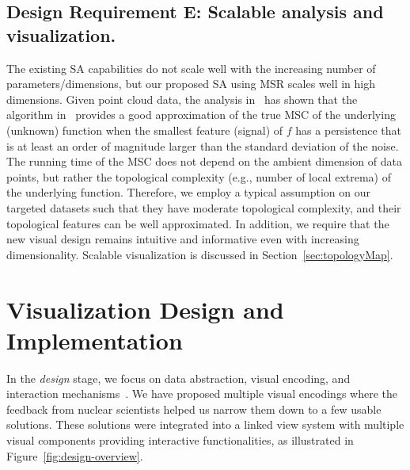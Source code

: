 \subsection{Design Requirement E: Scalable analysis and visualization.}

The existing SA capabilities do not scale well with the increasing number of parameters/dimensions, but our proposed SA using MSR scales well in high dimensions.
%
Given point cloud data, the analysis in~\cite{GerberRubelBremer2011} has shown that the algorithm in~\cite{GerberBremerPascucci2010} provides a good approximation of the true MSC of the underlying (unknown) function when the smallest feature (signal) of $f$ has a persistence that is at least an order of magnitude larger than the standard deviation of the noise.
%
The running time of the MSC does not depend on the ambient dimension of data points, but rather the topological complexity (e.g., number of local extrema) of the underlying function.
%
Therefore, we employ a typical assumption on our targeted datasets such that they have moderate  topological complexity, and their topological features can be well approximated.
%
In addition, we require that the new visual design remains intuitive and informative even with increasing dimensionality.
%
Scalable visualization is discussed in Section~\ref{sec:topologyMap}.

\section{Visualization Design and Implementation}
\label{sec:saDesign}

In the \emph{design} stage, we focus on data abstraction, visual encoding, and interaction mechanisms~\cite{SedlmairMeyerMunzner2012}.
%
We have proposed multiple visual encodings where the feedback from nuclear scientists helped us narrow them down to a few usable solutions.
%
These solutions were integrated into a linked view system with multiple visual components providing interactive functionalities, as illustrated in Figure~\ref{fig:design-overview}.

